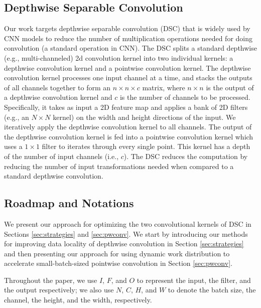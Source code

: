 \subsection{Depthwise Separable Convolution}
Our work targets depthwise separable convolution (DSC) that is widely used by  CNN  models to reduce the number of multiplication
operations needed for doing convolution (a standard operation in CNN). The DSC splits a standard depthwise (e.g., multi-channeled) 2d
convolution kernel into two individual kernels: a depthwise convolution kernel and a pointwise convolution kernel. The depthwise
convolution kernel processes one input channel at a time, and stacks the outputs of all channels together to form an $n \times n \times c$
matrix, where $n \times n$ is the output of a depthwise convolution kernel and $c$ is the number of channels to be processed. Specifically,
it takes as input a 2D feature map and applies a bank of 2D filters (e.g., an $N \times N$ kernel) on the width and height directions of
the input. We iteratively apply the depthwise convolution kernel to all channels. The output of the depthwise convolution kernel is fed
into a pointwise convolution kernel which uses a $1 \times 1$ filter to iterates through every single point. This kernel has a depth of the
number of input channels (i.e., $c$). The DSC reduces the computation by reducing the number of input transformations needed when compared
to a standard depthwise convolution.


\subsection{Roadmap and Notations} We present our approach for optimizing the two convolutional kernels of DSC in
Sections \ref {sec:strategies} and \ref {sec:pwconv}. We start by introducing our methods for improving data locality of depthwise
convolution in Section \ref{sec:strategies} and then presenting our approach for using dynamic work distribution to accelerate
small-batch-sized pointwise convolution in Section \ref {sec:pwconv}.

 Throughout the paper, we use $I$, $F$, and $O$ to represent the input, the filter, and the output respectively; we also
use $N$, $C$, $H$, and $W$ to denote the batch size, the channel, the height, and the width, respectively.
